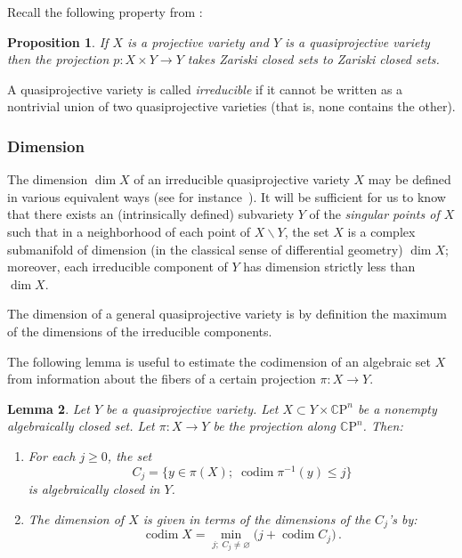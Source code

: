 \documentclass[10pt, a4paper]{amsart}
\theoremstyle{plain}
\newtheorem{lemma}{Lemma}[section]
\newtheorem{prop}[lemma]{Proposition}
\theoremstyle{definition}
\theoremstyle{remark}
\theoremstyle{note}
\numberwithin{equation}{section}
\begin{document}
Recall the following property from \cite[p.~58]{Shafa}:
 
\begin{prop}\label{p.projection}
If $X$ is a projective variety and $Y$ is a quasiprojective variety 
then the projection $p \colon X \times Y \to Y$ takes Zariski closed sets to Zariski closed sets.
\end{prop}

A quasiprojective variety is called \emph{irreducible} if it cannot be written as a nontrivial union of two quasiprojective varieties (that is, none contains the other).

\subsubsection{Dimension}
The dimension $\dim X$ of an irreducible quasiprojective variety $X$
may be defined in various equivalent ways (see for instance~\cite[p.~133ff]{Harris}). 
It will be sufficient for us to know that there exists an (intrinsically defined) 
subvariety $Y$ of the \emph{singular points of $X$}
such that in a neighborhood of each point of $X {\smallsetminus} Y$, the set 
$X$ is a complex submanifold of dimension (in the classical sense of differential geometry) $\dim X$;
moreover, each irreducible component of $Y$ has dimension strictly less than $\dim X$.

The dimension of a general quasiprojective variety is by definition the maximum of the dimensions of the irreducible components.

The following lemma is useful to estimate the codimension of an algebraic set $X$
from information about the fibers of a certain projection $\pi \colon X \to Y$.

\begin{lemma}\label{l.pret_a_porter}
Let $Y$ be a quasiprojective variety.  
Let $X \subset Y \times {\mathbb{C}\mathrm{P}}^n$ be a nonempty algebraically closed set.
Let $\pi \colon X \to Y$ be the projection along ${\mathbb{C}\mathrm{P}}^n$.
Then:
\begin{enumerate}
\item
For each $j \ge 0$, the set
$$
C_j = \{ y \in \pi(X) ; \; \operatorname{codim} \pi^{-1}(y) \le j \}
$$
is algebraically closed in $Y$.
\item
The dimension of $X$ is given in terms of the dimensions of the $C_j$'s by:
\begin{equation}\label{e.formula_pret_a_porter}
\operatorname{codim} X = \min_{j ; \; C_j \neq {\varnothing}} \big( j + \operatorname{codim} C_j \big) \, .
\end{equation}
\end{enumerate}
\end{lemma}
\end{document}
